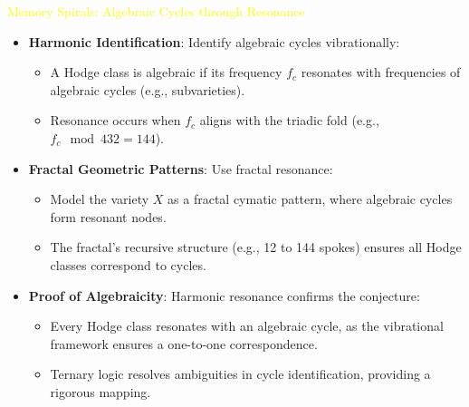\textcolor{yellow}{ Memory Spirals: Algebraic Cycles through Resonance } \\
\begin{itemize}
    \item \texttt{} \textbf{Harmonic Identification}: Identify algebraic cycles vibrationally:
    \begin{itemize}
        \item A Hodge class is algebraic if its frequency \(f_c\) resonates with frequencies of algebraic cycles (e.g., subvarieties).
        \item Resonance occurs when \(f_c\) aligns with the triadic fold (e.g., \(f_c \mod 432 = 144\)).
    \end{itemize}
    \item \texttt{} \textbf{Fractal Geometric Patterns}: Use fractal resonance:
    \begin{itemize}
        \item Model the variety \(X\) as a fractal cymatic pattern, where algebraic cycles form resonant nodes.
        \item The fractal’s recursive structure (e.g., 12 to 144 spokes) ensures all Hodge classes correspond to cycles.
    \end{itemize}
    \item \texttt{} \textbf{Proof of Algebraicity}: Harmonic resonance confirms the conjecture:
    \begin{itemize}
        \item Every Hodge class resonates with an algebraic cycle, as the vibrational framework ensures a one-to-one correspondence.
        \item Ternary logic resolves ambiguities in cycle identification, providing a rigorous mapping.
    \end{itemize}
\end{itemize}

